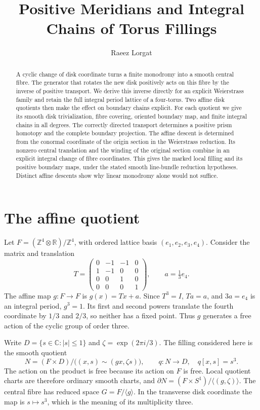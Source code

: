 \documentclass[11pt]{article}
\title{Positive Meridians and Integral Chains of Torus Fillings}
\author{Raeez Lorgat}
\date{}
\numberwithin{equation}{section}
\providecommand{\Z}{\mathbb Z}
\begin{document}
\maketitle
\begin{abstract}
A cyclic change of disk coordinate turns a finite monodromy into a
smooth central fibre. The generator that rotates the new disk positively
acts on this fibre by the inverse of positive transport. We derive this
inverse directly for an explicit Weierstrass family and retain the full
integral period lattice of a four-torus. Two affine disk quotients then
make the effect on boundary chains explicit. For each quotient we give
its smooth disk trivialization, fibre covering, oriented boundary map,
and finite integral chains in all degrees. The correctly directed
transport determines a positive prism homotopy and the complete boundary
projection. The affine descent is determined from the conormal coordinate of the
origin section in the Weierstrass reduction. Its nonzero central
translation and the winding of the original section combine in an
explicit integral change of fibre coordinates. This gives the marked
local filling and its positive boundary maps, under the stated smooth
line-bundle reduction hypotheses. Distinct affine descents show why
linear monodromy alone would not suffice.
\end{abstract}


\section{The affine quotient}

Let $F=(\Z^4\otimes\mathbb R)/\Z^4$, with ordered lattice basis
$(e_1,e_2,e_3,e_4)$. Consider the matrix and translation
\begin{equation}\label{eq:native-data}
 T=\begin{pmatrix}
 0&-1&-1&0\\1&-1&0&0\\0&0&1&0\\0&0&0&1
 \end{pmatrix},\qquad a=\tfrac13e_4.
\end{equation}
The affine map $g:F\to F$ is $g(x)=Tx+a$.
Since $T^3=I$, $Ta=a$, and $3a=e_4$ is an integral period,
$g^3=1$. Its first and second powers translate the fourth coordinate
by $1/3$ and $2/3$, so neither has a fixed point. Thus $g$ generates
a free action of the cyclic group of order three.

Write $D=\{s\in\mathbb C:|s|\le1\}$ and
$\zeta=\exp(2\pi i/3)$. The filling considered here is the smooth
quotient
\begin{equation}\label{eq:filling}
 N=(F\times D)/\bigl((x,s)\sim(gx,\zeta s)\bigr),
 \qquad q:N\longrightarrow D,\quad q[x,s]=s^3.
\end{equation}
The action on the product is free because its action on $F$ is free.
Local quotient charts are therefore ordinary smooth charts, and
$\partial N=(F\times S^1)/\langle(g,\zeta)\rangle$.
The central fibre has reduced space $G=F/\langle g\rangle$.
In the transverse disk coordinate the map is $s\mapsto s^3$, which
is the meaning of its multiplicity three.
\end{document}
